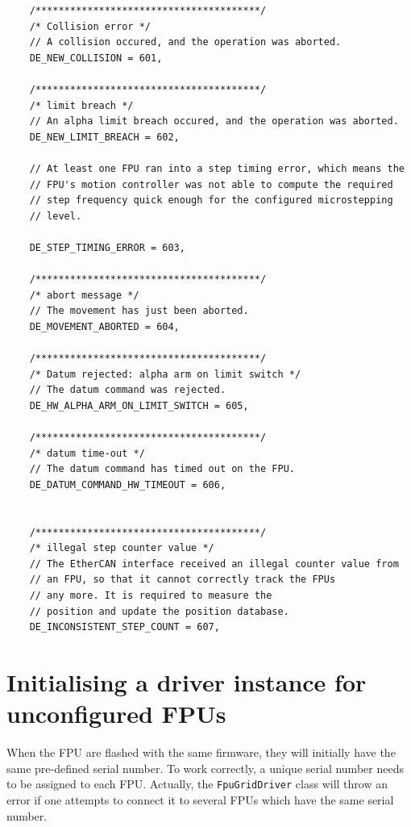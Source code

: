 \documentclass[fontsize=12,a4paper]{scrreprt}
\begin{document}
\begin{verbatim}
    /***************************************/
    /* Collision error */
    // A collision occured, and the operation was aborted.
    DE_NEW_COLLISION = 601,

    /***************************************/
    /* limit breach */
    // An alpha limit breach occured, and the operation was aborted.
    DE_NEW_LIMIT_BREACH = 602,

    // At least one FPU ran into a step timing error, which means the
    // FPU's motion controller was not able to compute the required
    // step frequency quick enough for the configured microstepping
    // level.

    DE_STEP_TIMING_ERROR = 603,

    /***************************************/
    /* abort message */
    // The movement has just been aborted.
    DE_MOVEMENT_ABORTED = 604,

    /***************************************/
    /* Datum rejected: alpha arm on limit switch */
    // The datum command was rejected.
    DE_HW_ALPHA_ARM_ON_LIMIT_SWITCH = 605,

    /***************************************/
    /* datum time-out */
    // The datum command has timed out on the FPU.
    DE_DATUM_COMMAND_HW_TIMEOUT = 606,


    /***************************************/
    /* illegal step counter value */
    // The EtherCAN interface received an illegal counter value from
    // an FPU, so that it cannot correctly track the FPUs
    // any more. It is required to measure the
    // position and update the position database.
    DE_INCONSISTENT_STEP_COUNT = 607,

\end{verbatim}


\chapter{Initialising a driver instance for unconfigured FPUs}

%
%
%
%
%
%


When the FPU are flashed with the same firmware, they will initially
have the same pre-defined serial number. To work correctly, a unique
serial number needs to be assigned to each FPU.  Actually, the
\texttt{FpuGridDriver} class will throw an error if one attempts to
connect it to several FPUs which have the same serial number.
\end{document}
